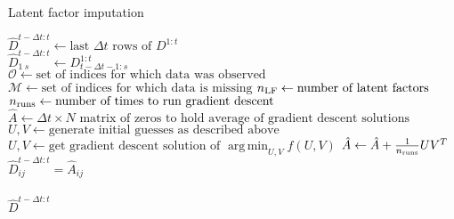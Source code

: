 \documentclass[12pt]{article}
\newcommand{\bigo}{\mathcal{O}}
\newcommand{\M}{\mathcal{M}}
\DeclareMathOperator*{\argmin}{arg\,min}
\begin{document}
\begin{algorithm}
    \caption{Latent factor imputation}
    \begin{algorithmic}[1]
        \State $\hat{D}^{t-\Delta t:t} \gets \textrm{last $\Delta t$ rows of $D^{1:t}$}$\\

                \State $\hat{D}^{t-\Delta t:t}_{1\ s} \gets D^{1:t}_{t-\Delta t-1:s}$
            \EndIf
        \EndFor\\

        \State $\bigo \gets \textrm{set of indices for which data was observed}$
        \State $\M \gets \textrm{set of indices for which data is missing}$
        \State $n_{\rm LF} \gets \textrm{number of latent factors}$\\

        \State $n_{\rm runs} \gets \textrm{number of times to run gradient descent}$
        \State $\hat{A} \gets \textrm{$\Delta t\times N$ matrix of zeros to hold average of gradient descent solutions}$\\
            \State $U, V \gets \textrm{generate initial guesses as described above}$
            \State $U, V \gets \textrm{get gradient descent solution of $\argmin_{U,V}f(U,V)$}$
            \State $\hat{A} \gets \hat{A} + \frac{1}{n_{\rm runs}} UV^T$
        \EndFor\\

        \For{$(i,j)\in \M$}
        \State $\hat{D}^{t-\Delta t:t}_{ij} = \hat{A}_{ij}$
        \EndFor\\\\

        \Return $\hat{D}^{t-\Delta t:t}$

    \end{algorithmic}
\end{algorithm}
\end{document}
